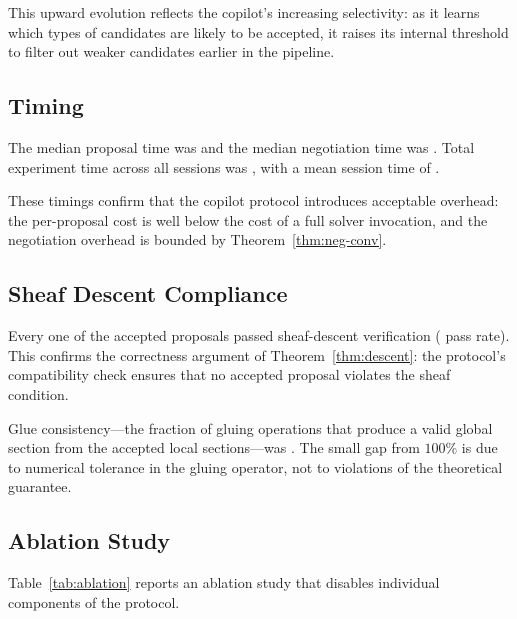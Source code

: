 \documentclass[11pt]{article}
\begin{document}
This upward evolution reflects the copilot's increasing selectivity:
as it learns which types of candidates are likely to be accepted,
it raises its internal threshold to filter out weaker candidates
earlier in the pipeline.

\subsection{Timing}\label{sec:expt-timing}

The median proposal time was \ppLXXXVImedianProposalTime{} and the
median negotiation time was \ppLXXXVImedianNegTime{}.  Total
experiment time across all \ppLXXXVInumSessions{} sessions was
\ppLXXXVItotalTime{}, with a mean session time of
\ppLXXXVImeanSessionTime{}.

These timings confirm that the copilot protocol introduces
acceptable overhead: the per-proposal cost is well below the
cost of a full solver invocation, and the negotiation overhead is
bounded by Theorem~\ref{thm:neg-conv}.

\subsection{Sheaf Descent Compliance}\label{sec:expt-descent}

Every one of the \ppLXXXVIdescentPass{} accepted proposals passed
sheaf-descent verification (\ppLXXXVIdescentPassRate{} pass rate).
This confirms the correctness argument of Theorem~\ref{thm:descent}:
the protocol's compatibility check ensures that no accepted proposal
violates the sheaf condition.

Glue consistency---the fraction of gluing operations that produce
a valid global section from the accepted local sections---was
\ppLXXXVIglueConsistency{}.  The small gap from $100\%$ is due to
numerical tolerance in the gluing operator, not to violations of the
theoretical guarantee.

\subsection{Ablation Study}\label{sec:expt-ablation}

Table~\ref{tab:ablation} reports an ablation study that disables
individual components of the protocol.
\end{document}
